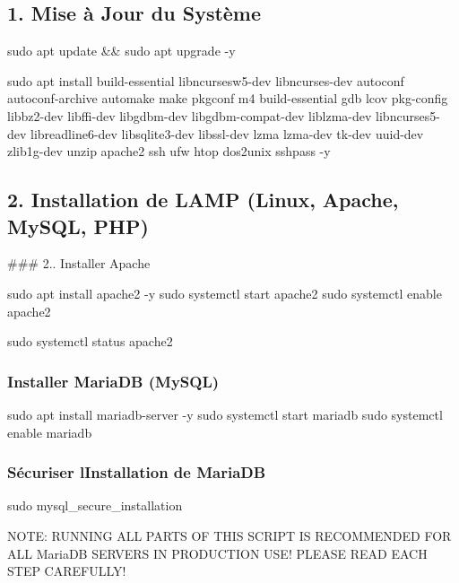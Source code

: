 \subsection*{1. Mise à Jour du Système}


\begin{DoxyCode}
sudo apt update && sudo apt upgrade -y

sudo apt install build-essential libncursesw5-dev libncurses-dev autoconf autoconf-archive automake make
       pkgconf m4 build-essential gdb lcov pkg-config   libbz2-dev libffi-dev libgdbm-dev libgdbm-compat-dev
       liblzma-dev   libncurses5-dev libreadline6-dev libsqlite3-dev libssl-dev  lzma lzma-dev tk-dev uuid-dev zlib1g-dev
       unzip apache2 ssh ufw htop dos2unix sshpass -y
\end{DoxyCode}


\subsection*{2. Installation de L\+A\+MP (Linux, Apache, My\+S\+QL, P\+HP)}

\#\#\# 2.. Installer Apache 
\begin{DoxyCode}
sudo apt install apache2 -y
sudo systemctl start apache2
sudo systemctl enable apache2

sudo systemctl status apache2
\end{DoxyCode}


\subsubsection*{Installer Maria\+DB (My\+S\+QL)}


\begin{DoxyCode}
sudo apt install mariadb-server -y
sudo systemctl start mariadb
sudo systemctl enable mariadb
\end{DoxyCode}


\subsubsection*{Sécuriser l\textquotesingle{}Installation de Maria\+DB}


\begin{DoxyCode}
sudo mysql\_secure\_installation
\end{DoxyCode}


N\+O\+TE\+: R\+U\+N\+N\+I\+NG A\+LL P\+A\+R\+TS OF T\+H\+IS S\+C\+R\+I\+PT IS R\+E\+C\+O\+M\+M\+E\+N\+D\+ED F\+OR A\+LL Maria\+DB S\+E\+R\+V\+E\+RS IN P\+R\+O\+D\+U\+C\+T\+I\+ON U\+S\+E! P\+L\+E\+A\+SE R\+E\+AD E\+A\+CH S\+T\+EP C\+A\+R\+E\+F\+U\+L\+L\+Y!

